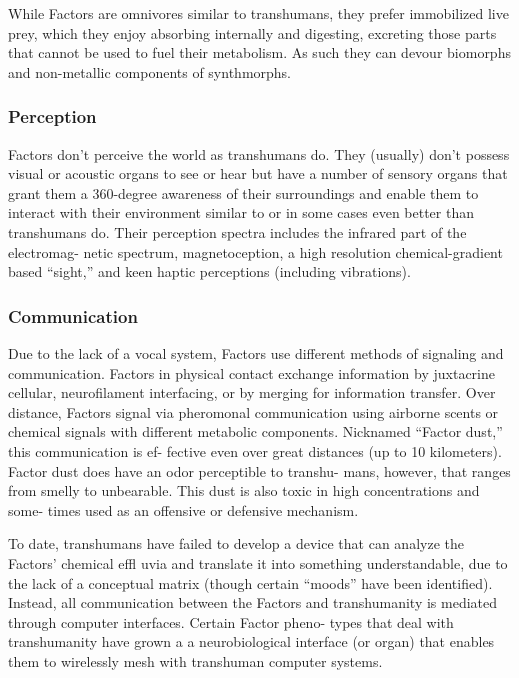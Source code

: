 While Factors are omnivores similar to transhumans, 
they prefer immobilized live prey, which they enjoy 
absorbing internally and digesting, excreting those 
parts that cannot be used to fuel their metabolism. 
As such they can devour biomorphs and non-metallic 
components of synthmorphs.

\subsubsection{Perception }

Factors don't perceive the world as transhumans 
do. They (usually) don't possess visual or acoustic 
organs to see or hear but have a number of sensory 
organs that grant them a 360-degree awareness of 
their surroundings and enable them to interact 
with their environment similar to or in some cases 
even better than transhumans do. Their perception 
spectra includes the infrared part of the electromag-
netic spectrum, magnetoception, a high resolution 
chemical-gradient based ``sight,'' and keen haptic 
perceptions (including vibrations). 

\subsubsection{Communication }

Due to the lack of a vocal system, Factors use different 
methods of signaling and communication. Factors in 
physical contact exchange information by juxtacrine 
cellular, neurofilament interfacing, or by merging for 
information transfer. Over distance, Factors signal via 
pheromonal communication using airborne scents or 
chemical signals with different metabolic components. 
Nicknamed ``Factor dust,'' this communication is ef-
fective even over great distances (up to 10 kilometers). 
Factor dust does have an odor perceptible to transhu-
mans, however, that ranges from smelly to unbearable. 
This dust is also toxic in high concentrations and some-
times used as an offensive or defensive mechanism.

To date, transhumans have failed to develop a device 
that can analyze the Factors' chemical effl uvia and 
translate it into something understandable, due to the 
lack of a conceptual matrix (though certain ``moods'' 
have been identified). Instead, all communication 
between the Factors and transhumanity is mediated 
through computer interfaces. Certain Factor pheno-
types that deal with transhumanity have grown a a 
neurobiological interface (or organ) that enables them 
to wirelessly mesh with transhuman computer systems.

